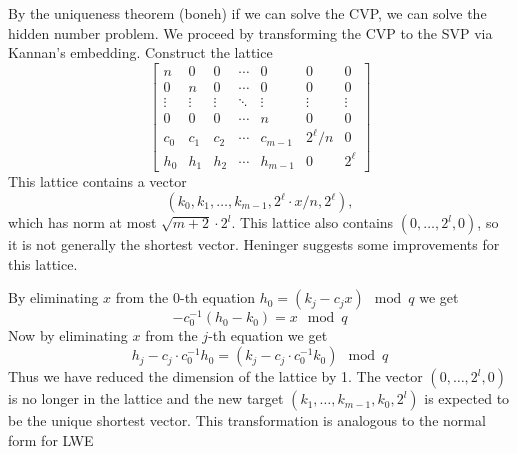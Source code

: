 By the uniqueness theorem (boneh) if we can solve the CVP, we can solve the hidden number problem. We proceed by transforming the CVP to the SVP via Kannan's embedding. Construct the lattice 
\[
\begin{bmatrix}
n & 0 & 0 & \cdots & 0 & 0 & 0 \\
0 & n & 0 & \cdots & 0 & 0 & 0 \\
\vdots & \vdots & \vdots & \ddots & \vdots & \vdots & \vdots \\
0 & 0 & 0 & \cdots & n & 0 & 0 \\
c_0 & c_1 & c_2 & \cdots & c_{m-1} & 2^\ell / n & 0 \\
h_0 & h_1 & h_2 & \cdots & h_{m-1} & 0 & 2^\ell
\end{bmatrix}
\]
This lattice contains a vector
\[
(k_0, k_1, \ldots, k_{m-1}, 2^\ell \cdot x / n, 2^\ell),
\]
which has norm at most $\sqrt{m+2} \cdot 2^l$. This lattice also contains $(0,\ldots, 2^l, 0)$, so it is not generally the shortest vector. Heninger suggests some improvements for this lattice.

By eliminating $x$ from the $0$-th equation $h_0 = (k_j - c_jx) \mod{q}$ we get
\begin{equation*}
    -c_0^{-1}(h_0 - k_0) = x \mod{q}
\end{equation*}
Now by eliminating $x$ from the $j$-th equation we get
\begin{equation*}
    h_j - c_j \cdot c_0^{-1}h_0 = (k_j - c_j \cdot c_0^{-1}k_0) \mod{q}
\end{equation*}
Thus we have reduced the dimension of the lattice by 1. The vector $(0,\ldots, 2^l, 0)$ is no longer in the lattice and the new target $(k_1, \ldots, k_{m-1}, k_0, 2^l)$ is expected to be the unique shortest vector. This transformation is analogous to the normal form for LWE
